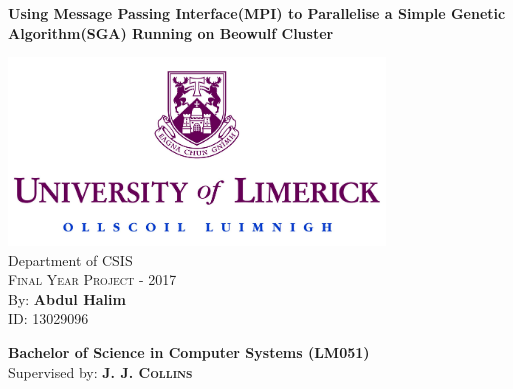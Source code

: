 \documentclass[a4paper,12pt,fleqn]{report}
\newcommand\blankpage{%
    \null
    \thispagestyle{empty}%
    \addtocounter{page}{-1}%
    \newpage}
\begin{document}
\begin{titlepage}
    \begin{center}
        \vspace*{0.5cm}
        
        \Huge
        \textbf{Using Message Passing Interface(MPI) to Parallelise a Simple Genetic Algorithm(SGA) Running on Beowulf Cluster}
        
        \vspace{0.5cm}
        
        \includegraphics[width=10cm]{figs/UL_Logo.jpeg} \\
        \large
        { \selectfont
        Department of CSIS} \\
        \vspace{0.8cm}
        \large
        \textsc{Final Year Project} - 2017 \\
        By: \textbf{Abdul Halim} \\
        ID: 13029096 \\
         \vspace{1cm}
        
        \vfill
        \textbf{Bachelor of Science in Computer Systems (LM051)} \\  
        \vspace{0.8cm}
        \normalsize
        \vspace{1cm}
        Supervised by: \textsc{\textbf{J. J. Collins}}
    \end{center}
\end{titlepage}
\afterpage{\blankpage}

\newpage
{}
\pagestyle{plain}

\pagebreak
\afterpage{\blankpage}
\end{document}
